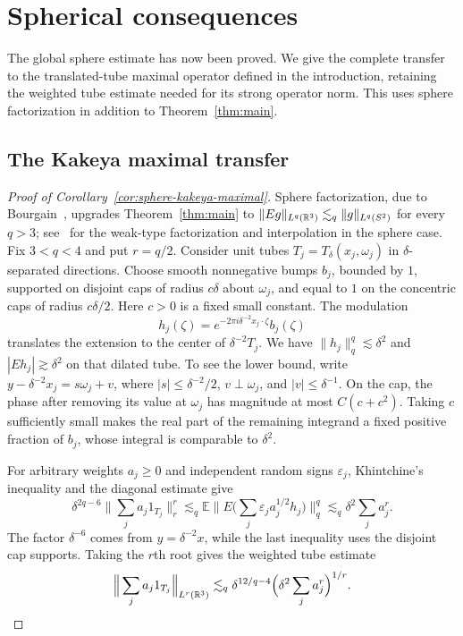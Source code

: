 \section{Spherical consequences}\label{sec:consequences}

The global sphere estimate has now been proved. We give the complete
transfer to the translated-tube maximal operator defined in the
introduction, retaining the weighted tube estimate needed for its
strong operator norm. This uses sphere factorization in addition to
Theorem~\ref{thm:main}.

\subsection{The Kakeya maximal transfer}

\begin{proof}[Proof of Corollary~\ref{cor:sphere-kakeya-maximal}]
Sphere factorization, due to Bourgain~\cite{Bourgain1991Besicovitch},
upgrades Theorem~\ref{thm:main} to
\(\|Eg\|_{L^q(\mathbb R^3)}\lesssim_q\|g\|_{L^q(S^2)}\) for every \(q>3\);
see~\cite[Section~1.1, (1.1)--(1.2)]{Buschenhenke2024} for the
weak-type factorization and interpolation in the sphere case.
Fix \(3<q<4\) and put $r=q/2$. Consider unit tubes
$T_j=T_\delta(x_j,\omega_j)$ in $\delta$-separated directions.
Choose smooth nonnegative bumps $b_j$, bounded by $1$, supported on
disjoint caps of radius $c\delta$ about $\omega_j$, and equal to $1$
on the concentric caps of radius $c\delta/2$. Here $c>0$ is a fixed
small constant. The modulation
\[
 h_j(\zeta)=e^{-2\pi i\delta^{-2}x_j\cdot\zeta}b_j(\zeta)
\]
translates the extension to the center of $\delta^{-2}T_j$.
We have $\|h_j\|_q^q\lesssim\delta^2$ and
$|Eh_j|\gtrsim\delta^2$ on that dilated tube. To see the lower bound,
write $y-\delta^{-2}x_j=s\omega_j+v$, where
$|s|\le\delta^{-2}/2$, $v\perp\omega_j$, and $|v|\le\delta^{-1}$.
On the cap, the phase after removing its value at $\omega_j$ has
magnitude at most $C(c+c^2)$. Taking $c$ sufficiently small makes
the real part of the remaining integrand a fixed positive fraction
of $b_j$, whose integral is comparable to $\delta^2$.

For arbitrary weights $a_j\ge0$ and independent random signs
$\varepsilon_j$, Khintchine's inequality and the diagonal estimate give
\[
 \delta^{2q-6}\Big\|\sum_j a_j1_{T_j}\Big\|_r^r
 \lesssim_q
 \mathbb E\Big\|E\Big(\sum_j\varepsilon_j a_j^{1/2}h_j\Big)\Big\|_q^q
 \lesssim_q\delta^2\sum_j a_j^r.
\]
The factor $\delta^{-6}$ comes from $y=\delta^{-2}x$, while the
last inequality uses the disjoint cap supports. Taking the $r$th
root gives the weighted tube estimate
\[
 \Big\|\sum_j a_j1_{T_j}\Big\|_{L^r(\mathbb R^3)}
 \lesssim_q \delta^{12/q-4}
       \Big(\delta^2\sum_j a_j^r\Big)^{1/r}.
\]


\end{proof}
